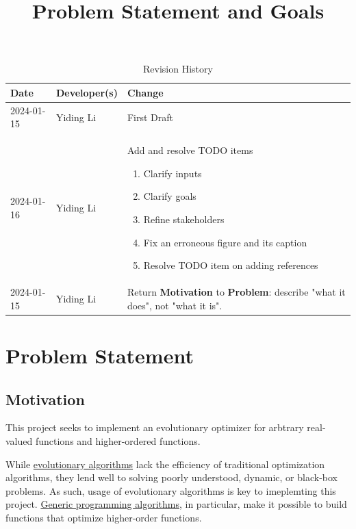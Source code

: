 \documentclass{article}
\title{Problem Statement and Goals\\\progname}
\author{\authname}
\date{}
\begin{document}
\maketitle

\begin{table}[hp]
\caption{Revision History} \label{TblRevisionHistory}
\begin{tabularx}{\textwidth}{llX}
\toprule
\textbf{Date} & \textbf{Developer(s)} & \textbf{Change}\\
\midrule
2024-01-15 & Yiding Li & First Draft\\
2024-01-16 & Yiding Li & Add and resolve TODO items
\begin{enumerate}
    \item Clarify inputs
    \item Clarify goals
    \item Refine stakeholders
    \item Fix an erroneous figure and its caption
    \item Resolve TODO item on adding references
\end{enumerate}
\\
2024-01-15 & Yiding Li & Return \textbf{Motivation} to \textbf{Problem}: describe "what it does", not "what it is".\\
\bottomrule
\end{tabularx}
\end{table}

\section{Problem Statement}


\subsection{Motivation}

This project seeks to implement an evolutionary optimizer for arbtrary real-valued functions and higher-ordered functions.

While \hyperref[sec:evalg]{evolutionary algorithms} lack the efficiency of traditional optimization algorithms, they lend well to solving poorly understood, dynamic, or black-box problems. As such, usage of evolutionary algorithms is key to imeplemting this project. \hyperref[sec:genalg]{Generic programming algorithms}, in particular, make it possible to build functions that optimize higher-order functions.
\end{document}
